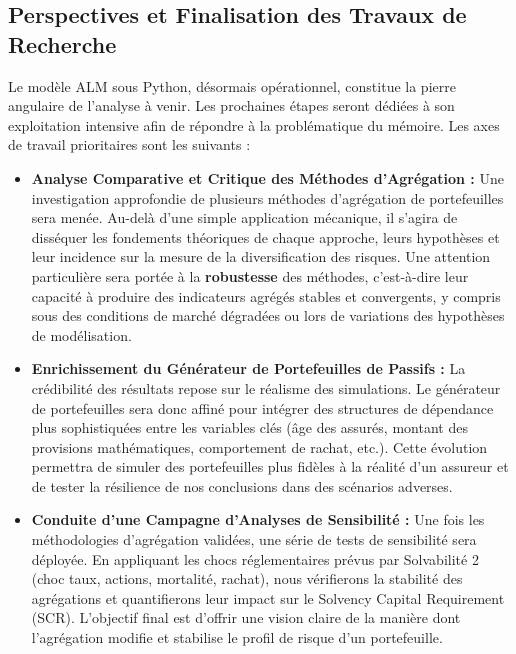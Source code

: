 \subsection{Perspectives et Finalisation des Travaux de Recherche}

Le modèle ALM sous Python, désormais opérationnel, constitue la pierre angulaire de l'analyse à venir. Les prochaines étapes seront dédiées à son exploitation intensive afin de répondre à la problématique du mémoire. Les axes de travail prioritaires sont les suivants :

\begin{itemize}
    \item \textbf{Analyse Comparative et Critique des Méthodes d'Agrégation :} Une investigation approfondie de plusieurs méthodes d'agrégation de portefeuilles sera menée. Au-delà d'une simple application mécanique, il s'agira de disséquer les fondements théoriques de chaque approche, leurs hypothèses et leur incidence sur la mesure de la diversification des risques. Une attention particulière sera portée à la \textbf{robustesse} des méthodes, c'est-à-dire leur capacité à produire des indicateurs agrégés stables et convergents, y compris sous des conditions de marché dégradées ou lors de variations des hypothèses de modélisation.

    \item \textbf{Enrichissement du Générateur de Portefeuilles de Passifs :} La crédibilité des résultats repose sur le réalisme des simulations. Le générateur de portefeuilles sera donc affiné pour intégrer des structures de dépendance plus sophistiquées entre les variables clés (âge des assurés, montant des provisions mathématiques, comportement de rachat, etc.). Cette évolution permettra de simuler des portefeuilles plus fidèles à la réalité d'un assureur et de tester la résilience de nos conclusions dans des scénarios adverses.

    \item \textbf{Conduite d'une Campagne d'Analyses de Sensibilité :} Une fois les méthodologies d'agrégation validées, une série de tests de sensibilité sera déployée. En appliquant les chocs réglementaires prévus par Solvabilité 2 (choc taux, actions, mortalité, rachat), nous vérifierons la stabilité des agrégations et quantifierons leur impact sur le Solvency Capital Requirement (SCR). L'objectif final est d'offrir une vision claire de la manière dont l'agrégation modifie et stabilise le profil de risque d'un portefeuille.
\end{itemize}

